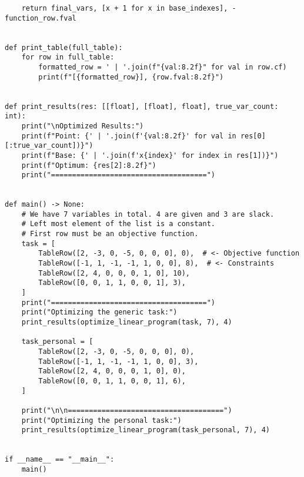 \documentclass[a4paper,12pt,fleqn]{article}
\begin{document}
\begin{verbatim}
    return final_vars, [x + 1 for x in base_indexes], -function_row.fval


def print_table(full_table):
    for row in full_table:
        formatted_row = ' | '.join(f"{val:8.2f}" for val in row.cf)
        print(f"[{formatted_row}], {row.fval:8.2f}")


def print_results(res: [[float], [float], float], true_var_count: int):
    print("\nOptimized Results:")
    print(f"Point: {' | '.join(f'{val:8.2f}' for val in res[0][:true_var_count])}")
    print(f"Base: {' | '.join(f'x{index}' for index in res[1])}")
    print(f"Optimum: {res[2]:8.2f}")
    print("=====================================")


def main() -> None:
    # We have 7 variables in total. 4 are given and 3 are slack.
    # Left most element of the list is a constant.
    # First row must be an objective function.
    task = [
        TableRow([2, -3, 0, -5, 0, 0, 0], 0),  # <- Objective function
        TableRow([-1, 1, -1, -1, 1, 0, 0], 8),  # <- Constraints
        TableRow([2, 4, 0, 0, 0, 1, 0], 10),
        TableRow([0, 0, 1, 1, 0, 0, 1], 3),
    ]
    print("=====================================")
    print("Optimizing the generic task:")
    print_results(optimize_linear_program(task, 7), 4)

    task_personal = [
        TableRow([2, -3, 0, -5, 0, 0, 0], 0),
        TableRow([-1, 1, -1, -1, 1, 0, 0], 3),
        TableRow([2, 4, 0, 0, 0, 1, 0], 0),
        TableRow([0, 0, 1, 1, 0, 0, 1], 6),
    ]

    print("\n\n=====================================")
    print("Optimizing the personal task:")
    print_results(optimize_linear_program(task_personal, 7), 4)


if __name__ == "__main__":
    main()
\end{verbatim}
\end{document}
